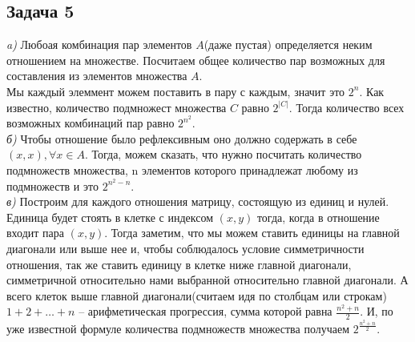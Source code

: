 	\subsection{Задача 5} 
	\textit{a)} Любоая комбинация пар элементов $A$(даже пустая) определяется неким отношением на множестве. Посчитаем общее количество пар возможных для составления из элементов множества $A$. \\
	Мы каждый элеммент можем поставить в пару с каждым, значит это $2^n$. 
	Как известно, количество подмножест множества $C$ равно $2^{|C|}$. Тогда количество всех возможных комбинаций пар равно $2^{n^2}$. \\
	\textit{б)} Чтобы отношение было рефлексивным оно должно содержать в себе $(x, x), \forall x \in A$. Тогда, можем сказать, что нужно посчитать количество подмножеств множества, n элементов которого принадлежат любому из подмножеств и это $2^{n^2 - n}$. \\
	\textit{в)} Построим для каждого отношения матрицу, состоящую из единиц и нулей. Единица будет стоять в клетке с индексом $(x, y)$ тогда, когда в отношение входит пара $(x, y)$. Тогда заметим, что мы можем ставить единицы на главной диагонали или выше нее и, чтобы соблюдалось условие симметричности отношения, так же ставить единицу в клетке ниже главной диагонали, симметричной относительно нами выбранной относительно главной диагонали. А всего клеток выше главной диагонали(считаем идя по столбцам или строкам) $1+2+ \ldots + n$ -- арифметическая прогрессия, сумма которой равна $\frac{n^2 + n}{2}$. И, по уже известной формуле количества подмножеств множества получаем $2^{\frac{n^2 + n}{2}}$.\\
	
	
